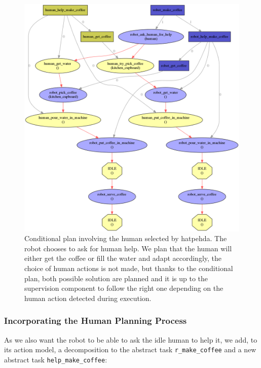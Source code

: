 \documentclass[a4paper,11pt,twoside]{StyleThese}
\begin{document}
\begin{figure}[hbtp]
\centering
\includegraphics[width=\textwidth]{figures/chapter4/Chap4CoopNoDivergence.png}
\caption{Conditional plan involving the human selected by \acrshort{hatpehda}. The robot chooses to ask for human help. We plan that the human will either get the coffee or fill the water and adapt accordingly, the choice of human actions is not made, but thanks to the conditional plan, both possible solution are planned and it is up to the supervision component to follow the right one depending on the human action detected during execution.}
\label{fig:chap4coffeecoopnodivergence}
\end{figure}


\subsubsection{Incorporating the Human Planning Process}
As we also want the robot to be able to ask the idle human to help it, we add, to its action model, a decomposition to the abstract task \verb'r_make_coffee' and a new abstract task \verb'help_make_coffee':
\end{document}
